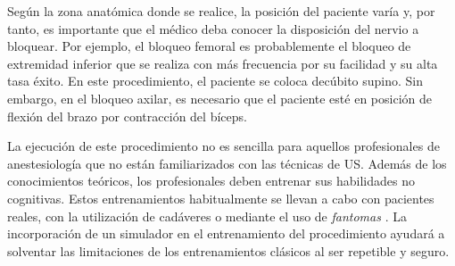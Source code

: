    
Según la zona anatómica donde se realice, la posición del paciente varía y, por tanto, es importante que el médico deba conocer la disposición del nervio a bloquear. Por ejemplo, el bloqueo femoral es probablemente el bloqueo de extremidad inferior que se realiza con más frecuencia por su facilidad y su alta tasa éxito. En este procedimiento, el paciente se coloca decúbito supino. Sin embargo, en el bloqueo axilar, es necesario que el paciente esté en posición de flexión del brazo por contracción del bíceps.


La ejecución de este procedimiento no es sencilla para aquellos profesionales de anestesiología que no están familiarizados con las técnicas de \ac{US}. Además de los conocimientos teóricos, los profesionales deben entrenar sus habilidades no cognitivas. Estos entrenamientos habitualmente se llevan a cabo con pacientes reales, con la utilización de cadáveres \cite{Tsui2007} o mediante el uso de \emph{fantomas} \cite{phantomra}. La incorporación de un simulador en el entrenamiento del procedimiento ayudará a solventar las limitaciones de los entrenamientos clásicos al ser repetible y seguro.


